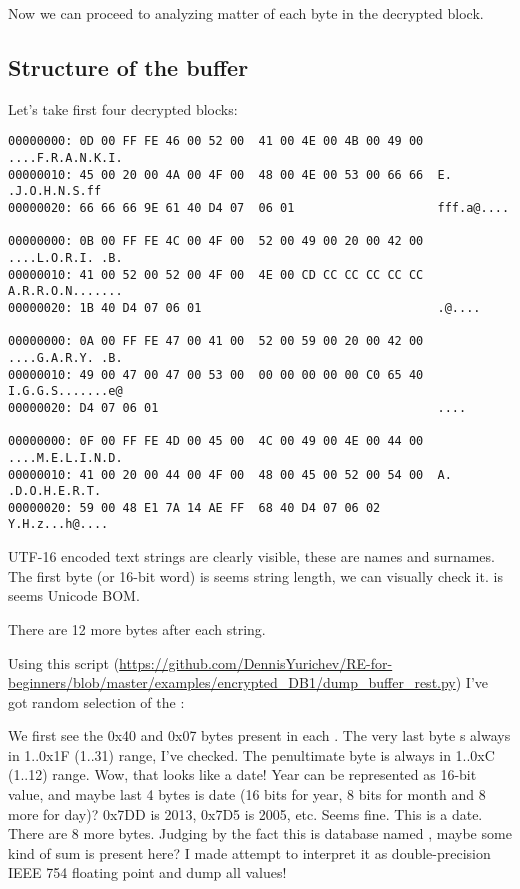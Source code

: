Now we can proceed to analyzing matter of each byte in the decrypted block.

\subsection{Structure of the buffer}

Let's take first four decrypted blocks:

\begin{lstlisting}
00000000: 0D 00 FF FE 46 00 52 00  41 00 4E 00 4B 00 49 00  ....F.R.A.N.K.I.
00000010: 45 00 20 00 4A 00 4F 00  48 00 4E 00 53 00 66 66  E. .J.O.H.N.S.ff
00000020: 66 66 66 9E 61 40 D4 07  06 01                    fff.a@....

00000000: 0B 00 FF FE 4C 00 4F 00  52 00 49 00 20 00 42 00  ....L.O.R.I. .B.
00000010: 41 00 52 00 52 00 4F 00  4E 00 CD CC CC CC CC CC  A.R.R.O.N.......
00000020: 1B 40 D4 07 06 01                                 .@....

00000000: 0A 00 FF FE 47 00 41 00  52 00 59 00 20 00 42 00  ....G.A.R.Y. .B.
00000010: 49 00 47 00 47 00 53 00  00 00 00 00 00 C0 65 40  I.G.G.S.......e@
00000020: D4 07 06 01                                       ....

00000000: 0F 00 FF FE 4D 00 45 00  4C 00 49 00 4E 00 44 00  ....M.E.L.I.N.D.
00000010: 41 00 20 00 44 00 4F 00  48 00 45 00 52 00 54 00  A. .D.O.H.E.R.T.
00000020: 59 00 48 E1 7A 14 AE FF  68 40 D4 07 06 02        Y.H.z...h@....
\end{lstlisting}

UTF-16 encoded text strings are clearly visible, these are names and surnames.
The first byte (or 16-bit word) is seems string length, we can visually check it.
 is seems Unicode \ac{BOM}.

There are 12 more bytes after each string.

Using this script
(\url{https://github.com/DennisYurichev/RE-for-beginners/blob/master/examples/encrypted_DB1/dump_buffer_rest.py})
I've got random selection of the :



We first see the 0x40 and 0x07 bytes present in each .
The very last byte s always in 1..0x1F (1..31) range, I've checked.
The penultimate byte is always in 1..0xC (1..12) range.
Wow, that looks like a date!
Year can be represented as 16-bit value, and maybe last 4 bytes is date (16 bits for year, 8 bits
for month and 8 more for day)?
0x7DD is 2013, 0x7D5 is 2005, etc. Seems fine. This is a date.
There are 8 more bytes.
Judging by the fact this is database named , maybe some kind of sum is present here?
I made attempt to interpret it as double-precision IEEE 754 floating point and dump all values!

